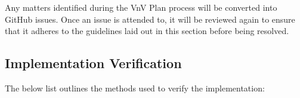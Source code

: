 \documentclass[12pt, titlepage]{article}
\renewcommand{\wss}[1]{}
\begin{document}
Any matters identified during the VnV Plan process will be converted into GitHub issues. Once an issue is attended to, it will be reviewed again to ensure that it adheres to the guidelines laid out in this section before being resolved.

\subsection{Implementation Verification}

\wss{You should at least point to the tests listed in this document and the unit
  testing plan.}

\wss{In this section you would also give any details of any plans for static
  verification of the implementation.  Potential techniques include code
  walkthroughs, code inspection, static analyzers, etc.}

\wss{The final class presentation in CAS 741 could be used as a code
walkthrough.  There is also a possibility of using the final presentation (in
CAS741) for a partial usability survey.}

The below list outlines the methods used to verify the implementation:
\end{document}
